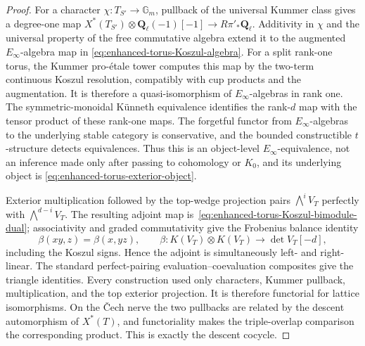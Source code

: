 \documentclass[11pt]{article}
\theoremstyle{definition}
\theoremstyle{remark}
\newcommand{\Qell}{\mathbf Q_\ell}
\begin{document}
\begin{proof}
For a character $\chi:T_{S'}\to\mathbb G_m$, pullback of the universal Kummer
class gives a degree-one map
$X^*(T_{S'})\otimes\Qell(-1)[-1]\to R\pi'_*\Qell$.  Additivity in $\chi$ and
the universal property of the free commutative algebra extend it to the
augmented $E_\infty$-algebra map in
\eqref{eq:enhanced-torus-Koszul-algebra}.  For a split rank-one torus, the
Kummer pro-\'etale tower computes this map by the two-term continuous Koszul
resolution, compatibly with cup products and the augmentation.  It is
therefore a quasi-isomorphism of $E_\infty$-algebras in rank one.  The
symmetric-monoidal K\"unneth equivalence identifies the rank-$d$ map with the
tensor product of these rank-one maps.  The forgetful functor from
$E_\infty$-algebras to the underlying stable category is conservative, and
the bounded constructible $t$-structure detects equivalences.  Thus this is
an object-level $E_\infty$-equivalence, not an inference made only after
passing to cohomology or $K_0$, and its underlying object is
\eqref{eq:enhanced-torus-exterior-object}.

Exterior multiplication followed by the top-wedge projection pairs
$\bigwedge^iV_T$ perfectly with $\bigwedge^{d-i}V_T$.  The resulting adjoint
map is~\eqref{eq:enhanced-torus-Koszul-bimodule-dual}; associativity and graded
commutativity give the Frobenius balance identity
\[
 \beta(xy,z)=\beta(x,yz),
 \qquad
 \beta:K(V_T)\otimes K(V_T)\longrightarrow\det V_T[-d],
\]
including the Koszul signs.  Hence the adjoint is simultaneously left- and
right-linear.  The standard
perfect-pairing evaluation--coevaluation composites give the triangle
identities.  Every construction used only characters, Kummer pullback,
multiplication, and the top exterior projection.  It is therefore functorial
for lattice isomorphisms.  On the \v{C}ech nerve the two pullbacks are related by
the descent automorphism of $X^*(T)$, and functoriality makes the triple-overlap
comparison the corresponding product.  This is exactly the descent cocycle.
\end{proof}
\end{document}
